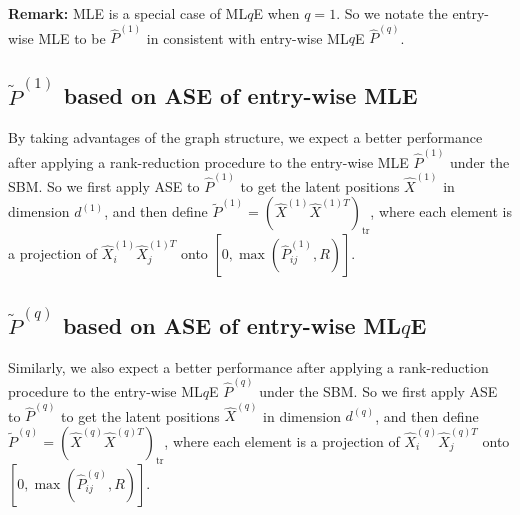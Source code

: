 \documentclass[a4paper]{article}
\begin{document}
\noindent \textbf{Remark:} MLE is a special case of ML$q$E when $q = 1$. So we notate the entry-wise MLE to be $\hat{P}^{(1)}$ in consistent with entry-wise ML$q$E $\hat{P}^{(q)}$.


\subsection{$\widetilde{P}^{(1)}$ based on ASE of entry-wise MLE}
By taking advantages of the graph structure, we expect a better performance after applying a rank-reduction procedure to the entry-wise MLE $\hat{P}^{(1)}$ under the SBM. So we first apply ASE to $\hat{P}^{(1)}$ to get the latent positions $\hat{X}^{(1)}$ in dimension $d^{(1)}$, and then define $\widetilde{P}^{(1)} = (\hat{X}^{(1)} \hat{X}^{{(1)}T})_{\mathrm{tr}}$, where each element is a projection of $\hat{X}^{(1)}_i \hat{X}^{{(1)}T}_j$ onto $[0, \max(\hat{P}^{(1)}_{ij}, R)]$.



\subsection{$\widetilde{P}^{(q)}$ based on ASE of entry-wise ML$q$E}
Similarly, we also expect a better performance after applying a rank-reduction procedure to the entry-wise ML$q$E $\hat{P}^{(q)}$ under the SBM. So we first apply ASE to $\hat{P}^{(q)}$ to get the latent positions $\hat{X}^{(q)}$ in dimension $d^{(q)}$, and then define $\widetilde{P}^{(q)} = (\hat{X}^{(q)} \hat{X}^{{(q)}T})_{\mathrm{tr}}$, where each element is a projection of $\hat{X}^{(q)}_i \hat{X}^{{(q)}T}_j$ onto $[0, \max(\hat{P}^{(q)}_{ij}, R)]$.
\end{document}

